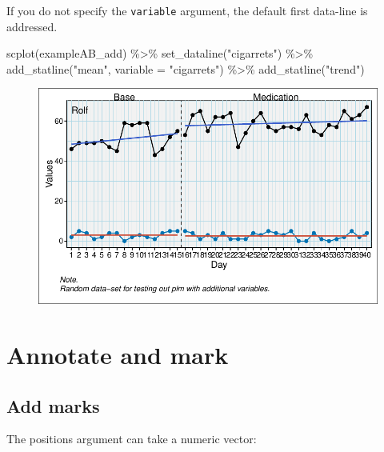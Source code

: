 \documentclass[
  letterpaper,
  DIV=11,
  numbers=noendperiod]{scrreprt}
\newenvironment{Shaded}{\begin{snugshade}}{\end{snugshade}}
\newcommand{\AttributeTok}[1]{\textcolor[rgb]{0.40,0.45,0.13}{#1}}
\newcommand{\FunctionTok}[1]{\textcolor[rgb]{0.28,0.35,0.67}{#1}}
\newcommand{\NormalTok}[1]{\textcolor[rgb]{0.00,0.23,0.31}{#1}}
\newcommand{\SpecialCharTok}[1]{\textcolor[rgb]{0.37,0.37,0.37}{#1}}
\newcommand{\StringTok}[1]{\textcolor[rgb]{0.13,0.47,0.30}{#1}}
\begin{document}
If you do not specify the \texttt{variable} argument, the default first
data-line is addressed.

\begin{Shaded}
\begin{Highlighting}[]
\FunctionTok{scplot}\NormalTok{(exampleAB\_add) }\SpecialCharTok{\%\textgreater{}\%}
  \FunctionTok{set\_dataline}\NormalTok{(}\StringTok{"cigarrets"}\NormalTok{) }\SpecialCharTok{\%\textgreater{}\%}
  \FunctionTok{add\_statline}\NormalTok{(}\StringTok{"mean"}\NormalTok{, }\AttributeTok{variable =} \StringTok{"cigarrets"}\NormalTok{) }\SpecialCharTok{\%\textgreater{}\%}
  \FunctionTok{add\_statline}\NormalTok{(}\StringTok{"trend"}\NormalTok{)}
\end{Highlighting}
\end{Shaded}

\begin{figure}[H]

{\centering \includegraphics{./ch_scplot_files/figure-pdf/scplot-dataline-1-1.pdf}

}

\end{figure}

\hypertarget{annotate-and-mark}{%
\section{Annotate and mark}\label{annotate-and-mark}}

\hypertarget{add-marks}{%
\subsection{Add marks}\label{add-marks}}

The positions argument can take a numeric vector:
\end{document}
